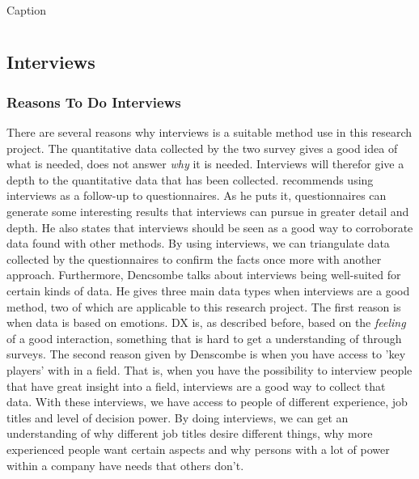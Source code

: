 \documentclass{article}
\begin{document}
\begin{table}[]
\begin{tabularx}{\columnwidth}{X r}
\end{tabularx}
\caption{Caption}
\label{tab:allQPart2}
\end{table}

\subsection{Interviews}

\subsubsection{Reasons To Do Interviews}
There are several reasons why interviews is a suitable method use in this research project.
The quantitative data collected
by the two survey gives a good idea of what is needed, does not answer \textit{why} it is needed.
Interviews will therefor give a depth to the quantitative data that has been collected.
\cite{denscombe} recommends using interviews as a follow-up to questionnaires. As he puts it,
questionnaires can generate some interesting results that interviews can pursue
in greater detail and depth. He also states that interviews should be seen as a good way
to corroborate data found with other methods. By using interviews, we can triangulate data
collected by the questionnaires to confirm the facts once more with another approach.
Furthermore, Dencsombe talks about interviews being well-suited for certain kinds of data.
He gives three main data types when interviews are a good method,
two of which are applicable to this research project. The first reason is
when data is based on emotions. DX is, as described before, based on the \textit{feeling}
of a good interaction, something that is hard to get a understanding of through
surveys. The second reason given by Denscombe is when you have access to 'key players'
with in a field. That is, when you have the possibility to interview people
that have great insight into a field, interviews are a good way to collect that data.
With these interviews, we have access to people of different experience, job titles
and level of decision power. By doing interviews, we can get an understanding
of why different job titles desire different things, why more experienced people
want certain aspects and why persons with a lot of power within a company
have needs that others don't.
\end{document}
